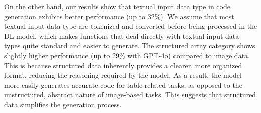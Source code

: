 %
On the other hand, our results show that textual input data type in code generation exhibits better performance (up to 32\%). We assume that most textual input data type are tokenized and converted before being processed in the DL model, which makes functions that deal directly with textual input data types quite standard and easier to generate.
The structured array category shows slightly higher performance (up to 29\% with GPT-4o) compared to image data.
This is because structured data inherently provides a clearer, more organized format, reducing the reasoning required by the model. As a result, the model more easily generates accurate code for table-related tasks, as opposed to the unstructured, abstract nature of image-based tasks. This suggests that structured data simplifies the generation process.

%



